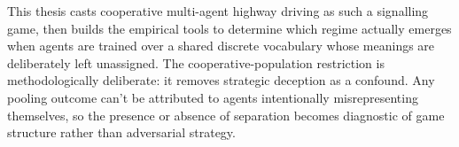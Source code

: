 \documentclass[12pt,a4paper]{article}
\begin{document}
This thesis casts cooperative multi-agent highway driving as such a signalling game, then builds
the empirical tools to determine which regime actually emerges when agents are trained over a
shared discrete vocabulary whose meanings are deliberately left unassigned. The
cooperative-population restriction is methodologically deliberate: it removes strategic deception
as a confound. Any pooling outcome can't be attributed to agents intentionally misrepresenting
themselves, so the presence or absence of separation becomes diagnostic of game structure rather
than adversarial strategy.

%
%
%
\end{document}
